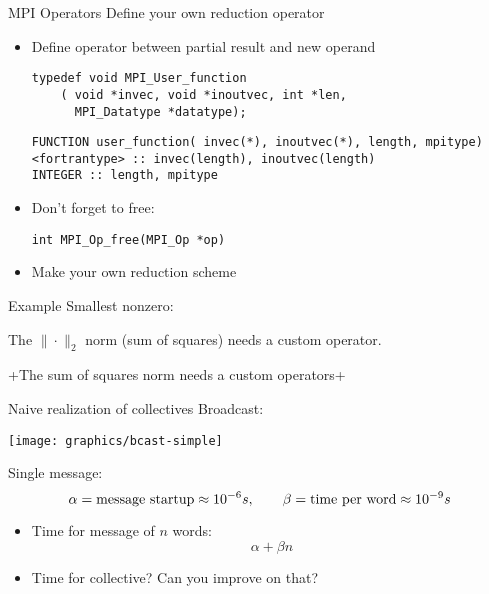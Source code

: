 \begin{numberedframe}{MPI Operators}
  Define your own reduction operator
  \begin{itemize}
  \item Define operator between partial result and new operand
\lstset{language=C}
\begin{lstlisting}
typedef void MPI_User_function
    ( void *invec, void *inoutvec, int *len, 
      MPI_Datatype *datatype); 
\end{lstlisting}
\lstset{language=Fortran}
\begin{lstlisting}
FUNCTION user_function( invec(*), inoutvec(*), length, mpitype)
<fortrantype> :: invec(length), inoutvec(length) 
INTEGER :: length, mpitype
\end{lstlisting}
\item Don't forget to free:
\lstset{language=C}
\begin{lstlisting}
int MPI_Op_free(MPI_Op *op)  
\end{lstlisting}
\item Make your own reduction scheme 
  \end{itemize}
\end{numberedframe}


\begin{numberedframe}{Example}
  Smallest nonzero:
  
\end{numberedframe}

\begin{reviewframe}
  The $\|\cdot\|_2$ norm (sum of squares) needs a custom operator.
  
  \slackpollTF+The sum of squares norm needs a custom operators+
\end{reviewframe}


\begin{numberedframe}{Naive realization of collectives}
  Broadcast:
  
  \texttt{[image: graphics/bcast-simple]}

  Single message:
  \[ \alpha=\hbox{message startup}\approx 10^{-6}s,\qquad
  \beta=\hbox{time per word}\approx 10^{-9}s
  \]
  \begin{itemize}
  \item Time for message of $n$ words: \[ \alpha +\beta n \]
  \item Time for collective? Can you improve on that?
  \end{itemize}

\end{numberedframe}

